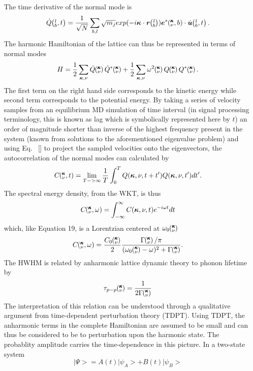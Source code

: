 %
The time derivative of the normal mode is
%
\begin{equation}
\dot{Q}\lbt=\frac{1}{\sqrt{N}}\sum_{b,l}\sqrt{m_j}exp(-i\bm{\kappa}\cdot\bm{r}\lb)\bm{e}^*\kvb\cdot\dot{\bm{u}}\lbt.
\end{equation}
%
The harmonic Hamiltonian of the lattice can thus be represented in terms of normal modes
%
\begin{equation}
H=\frac{1}{2}\sum_{\bm{\kappa},\nu}\dot{Q}\kv\dot{Q}^*\kv+\frac{1}{2}\sum_{\bm{\kappa},\nu}\omega^2\kv Q\kv Q^*\kv.
\end{equation}
%
The first term on the right hand side corresponds to the kinetic energy while second term corresponds to the potential energy. By taking a series of velocity samples from an equilibrium MD simulation of time interval (in signal processing terminology, this is known as lag which is symbolically represented here by $t$) an order of magnitude shorter than inverse of the highest frequency present in the system (known from solutions to the aforementioned eigenvalue problem) and using Eq. ~\ref{} to project the sampled velocities onto the eigenvectors, the autocorrelation of the normal modes can calculated by
%
\begin{equation}
C\mspace{-4.0mu}\left(\mspace{-8.0mu} \begin{smallmatrix}&\pmb{\kappa} \\&\nu\end{smallmatrix} \mspace{-2.0mu},t\right)=\lim_{T->\infty}\frac{1}{T}\int_{0}^{T}Q(\bm{\kappa},\nu,t+t')Q(\bm{\kappa},\nu,t')dt'.
\end{equation}
%
The spectral energy density, from the WKT, is thus
%
\begin{equation}
C\mspace{-4.0mu}\left(\mspace{-8.0mu} \begin{smallmatrix}&\pmb{\kappa} \\&\nu\end{smallmatrix} \mspace{-2.0mu},\omega\right)=\int_{-\infty}^{\infty}C(\bm{\kappa},\nu,t)e^{-i\omega t}dt
\end{equation}
%
which, like Equation 19, is a Lorentzian centered at $\omega_0\mspace{-4.0mu}\left(\mspace{-8.0mu} \begin{smallmatrix}&\pmb{\kappa} \\&\nu\end{smallmatrix} \mspace{-3.0mu}\right)$
%
\begin{equation}
C\kvw=\frac{C_0\kv}{2}\frac{\Gamma\kv/\pi}{(\omega_0\kv-\omega)^2+\Gamma\kv}.
\end{equation}
%
The HWHM is related by anharmonic lattice dynamic theory \cite{PhysRev.128.2589} to phonon lifetime by
%
\begin{equation}
\tau_{p-p}\mspace{-4.0mu}\left(\mspace{-8.0mu} \begin{smallmatrix}&\pmb{\kappa} \\&\nu\end{smallmatrix} \mspace{-3.0mu}\right)=\frac{1}{2\Gamma\mspace{-4.0mu}\left(\mspace{-8.0mu} \begin{smallmatrix}&\pmb{\kappa} \\&\nu\end{smallmatrix} \mspace{-3.0mu}\right)}
\end{equation}
%
The interpretation of this relation can be understood through a qualitative argument from time-dependent perturbation theory (TDPT). Using TDPT, the anharmonic terms in the complete Hamiltonian are assumed to be small and can thus be considered to be to perturbation upon the harmonic state. The probablity amplitude carries the time-dependence in this picture. In a two-state system
%
\begin{equation}
|\Psi>=A(t)|\psi_A>+B(t)|\psi_B>
\end{equation}

